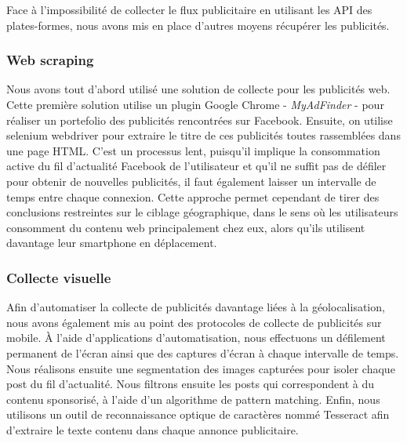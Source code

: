 \documentclass[runningheads]{llncs}
\begin{document}
Face à l'impossibilité de collecter le flux publicitaire en utilisant les API des plates-formes, nous avons mis en place d'autres moyens récupérer les publicités. 

\subsubsection{Web scraping}\label{collecte_web}

Nous avons tout d'abord utilisé une solution de collecte pour les publicités web. Cette première solution utilise un plugin Google Chrome - \textit{MyAdFinder} - pour réaliser un portefolio des publicités rencontrées sur Facebook. Ensuite, on utilise selenium webdriver pour extraire le titre de ces publicités toutes rassemblées dans une page HTML. C'est un processus lent, puisqu'il implique la consommation active du fil d'actualité Facebook de l'utilisateur et qu'il ne suffit pas de défiler pour obtenir de nouvelles publicités, il faut également laisser un intervalle de temps entre chaque connexion. 
Cette approche permet cependant de tirer des conclusions restreintes sur le ciblage géographique, dans le sens où les utilisateurs consomment du contenu web principalement chez eux, alors qu'ils utilisent davantage leur smartphone en déplacement.

\subsubsection{Collecte visuelle}\label{collecte_mobile}

Afin d'automatiser la collecte de publicités davantage liées à la géolocalisation, nous avons également mis au point des protocoles de collecte de publicités sur mobile. À l'aide d'applications d'automatisation, nous effectuons un défilement permanent de l'écran ainsi que des captures d'écran à chaque intervalle de temps. Nous réalisons ensuite une segmentation des images capturées pour isoler chaque post du fil d'actualité. Nous filtrons ensuite les posts qui correspondent à du contenu sponsorisé, à l'aide d'un algorithme de pattern matching. Enfin, nous utilisons un outil de reconnaissance optique de caractères nommé Tesseract afin d'extraire le texte contenu dans chaque annonce publicitaire.
\end{document}
